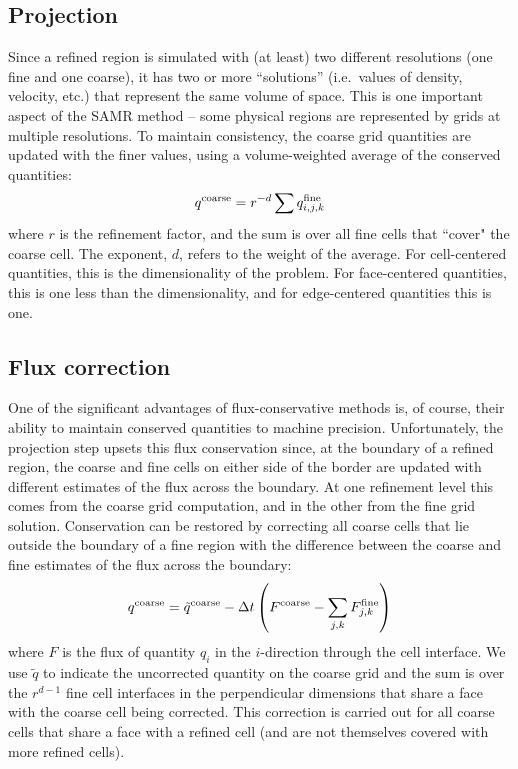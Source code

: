 \subsection{Projection}
\label{sec:projection}

Since a refined region is simulated with (at least) two different resolutions (one fine and one coarse), it has two or
more ``solutions'' (i.e.~values of density, velocity, etc.) that represent the same volume of space.  This is one important aspect of the SAMR method -- some physical regions are represented by grids at multiple resolutions.  To
maintain consistency, the coarse grid quantities are updated with the finer values, using a volume-weighted average of the conserved quantities:
\begin{equation}
q^{\rm coarse} = r^{-d} \sum q^{\rm fine}_{i, j,k}
\end{equation}
where $r$ is the refinement factor, and the sum is over all fine cells that ``cover" the coarse cell. The exponent, $d$, refers to the weight of the average.  For cell-centered quantities, this is the dimensionality of the problem.  For face-centered quantities, this is one less than the dimensionality, and for edge-centered quantities this is one.


\subsection{Flux correction}
\label{sec:flux_correction}

One of the significant advantages of flux-conservative methods is, of course, their ability to maintain conserved quantities to machine precision.  Unfortunately, the projection step upsets this flux conservation since, at the boundary of a refined region, the coarse and fine cells on either side of the border are updated with different estimates of the flux across the boundary.  At one refinement level this comes from the coarse grid computation, and in the other from the fine grid solution.  Conservation can be restored by correcting all coarse cells that lie outside the boundary of a fine region
with the difference between the coarse and fine estimates of the flux
across the boundary:
\begin{equation}
  q^{\rm coarse} = \tilde{q}^{\rm coarse} - \Delta t \left( F^{\rm
      coarse} - \sum_{j,k} F^{\rm fine}_{j,k} \right)
\end{equation}
where $F$ is the flux of quantity $q_i$ in the $i$-direction through the cell interface.   We use $\tilde{q}$ to indicate the uncorrected quantity on the coarse grid and the sum is over the $r^{d-1}$ fine cell interfaces in the perpendicular dimensions that share a face with the coarse cell being corrected.  This correction is carried out for all coarse cells that share a face with a refined cell (and are not themselves covered with more refined cells).

